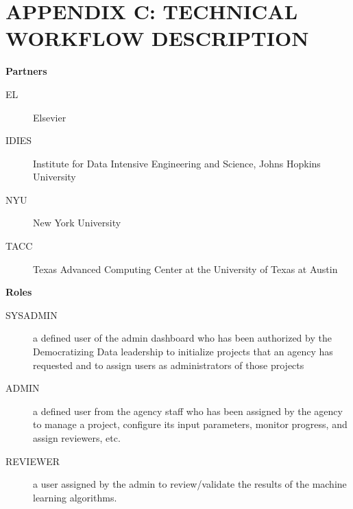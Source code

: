 \documentclass[titlepage, 11pt]{article}
\begin{document}
{\begin{table}[h!]
{\begin{tabularx}{1\textwidth} {|p{4cm}|p{5.33cm}|p{2cm}|p{1.5cm}|p{1.5cm}|}
\end{tabularx}
\label{table: appendix b - topic}
}
\end{table}



\clearpage
\section*{APPENDIX C: TECHNICAL WORKFLOW DESCRIPTION}
\label{sec:APPENDIXC}

\textbf{\textcolor{TealBlue}{Partners}}
\begin{description}
   \item[EL] Elsevier
   \item[IDIES] Institute for Data Intensive Engineering and Science, Johns Hopkins University
   \item[NYU] New York University
   \item[TACC] Texas Advanced Computing Center at the University of Texas at Austin
\end{description}

\bigskip

\textbf{\textcolor{TealBlue}{Roles}}
\begin{description}
    \item[SYSADMIN] a defined user of the admin dashboard who has been authorized by the Democratizing Data leadership to initialize projects that an agency has requested and to assign users as administrators of those projects
    \item[ADMIN] a defined user from the agency staff who has been assigned by the agency to manage a project, configure its input parameters, monitor progress, and assign reviewers, etc.
    \item[REVIEWER] a user assigned by the admin to review/validate the results of the machine learning algorithms.
\end{description}

\bigskip

}
\end{document}
